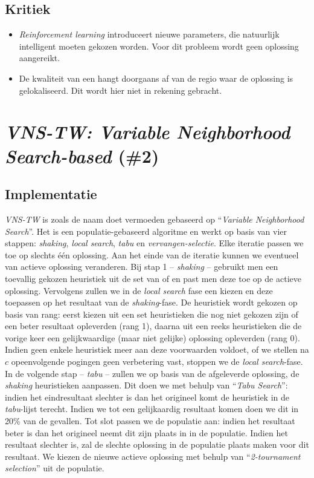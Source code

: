 \subsection{Kritiek}
\begin{itemize}
 \item \emph{Reinforcement learning} introduceert nieuwe parameters, die natuurlijk intelligent moeten gekozen worden. Voor dit probleem wordt geen oplossing aangereikt.
 \item De kwaliteit van een \abllh{} hangt doorgaans af van de regio waar de oplossing is gelokaliseerd. Dit wordt hier niet in rekening gebracht.
\end{itemize}
\section{\emph{VNS-TW: Variable Neighborhood Search-based} (\#2)}
\label{sss:vns-tw}
\subsection{Implementatie}
\emph{VNS-TW}\cite{chesc-vns-tw} is zoals de naam doet vermoeden gebaseerd op ``\emph{Variable Neighborhood Search}''\cite{hom/vns}. Het is een populatie-gebaseerd algoritme en werkt op basis van vier stappen: \emph{shaking}, \emph{local search}, \emph{tabu} en \emph{vervangen-selectie}. Elke iteratie passen we toe op slechts \'e\'en oplossing. Aan het einde van de iteratie kunnen we eventueel van actieve oplossing veranderen. Bij stap 1 -- \emph{shaking} -- gebruikt men een toevallig gekozen heuristiek uit de set van \abmt{} of \abrr{} \abllhn{} en past men deze toe op de actieve oplossing. Vervolgens zullen we in de \emph{local search} fase een \abls{} \abh{} kiezen en deze toepassen op het resultaat van de \emph{shaking}-fase. De heuristiek wordt gekozen op basis van rang: eerst kiezen uit een set heuristieken die nog niet gekozen zijn of een beter resultaat opleverden (rang 1), daarna uit een reeks heuristieken die de vorige keer een gelijkwaardige (maar niet gelijke) oplossing opleverden (rang 0). Indien geen enkele heuristiek meer aan deze  voorwaarden voldoet, of we stellen na $c$ opeenvolgende pogingen geen verbetering vast, stoppen we de \emph{local search}-fase. In de volgende stap -- \emph{tabu} -- zullen we op basis van de afgeleverde oplossing, de \emph{shaking} heuristieken aanpassen. Dit doen we met behulp van ``\emph{Tabu Search}''\cite{DBLP:journals/informs/Glover89}: indien het eindresultaat slechter is dan het origineel komt de heuristiek in de \emph{tabu}-lijst terecht. Indien we tot een gelijkaardig resultaat komen doen we dit in 20\% van de gevallen. Tot slot passen we de populatie aan: indien het resultaat beter is dan het origineel neemt dit zijn plaats in in de populatie. Indien het resultaat slechter is, zal de slechte oplossing in de populatie plaats maken voor dit resultaat. We kiezen de nieuwe actieve oplossing met behulp van ``\emph{2-tournament selection}''\cite{Miller95geneticalgorithms} uit de populatie.
